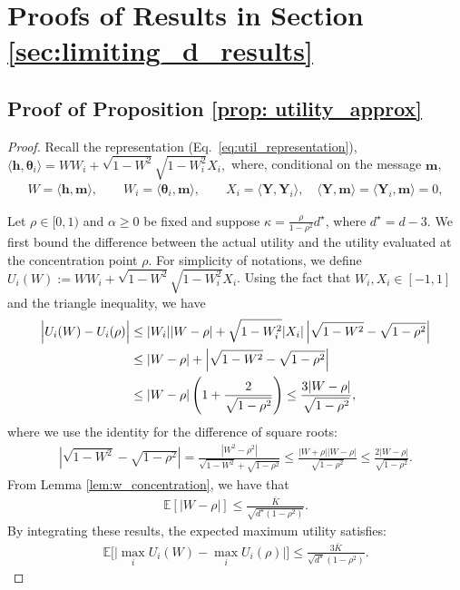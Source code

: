 \documentclass[12pt]{article}
\theoremstyle{definition}
\theoremstyle{remark}
\begin{document}
\section{Proofs of Results in Section \ref{sec:limiting_d_results}}

\subsection{Proof of Proposition \ref{prop: utility_approx}}
\label{sec:proof_prop_util_approx}

\begin{proof}
Recall the representation (Eq.~\eqref{eq:util_representation}), $\langle \mathbf{h},\boldsymbol{\theta}_i\rangle  =  W W_i  +  \sqrt{1-W^2} \sqrt{1-W_i^2} X_i,$ where, conditional on the message $\mathbf{m}$,
\begin{align*}
W=\langle \mathbf{h},\mathbf{m}\rangle,\qquad W_i=\langle \boldsymbol{\theta}_i,\mathbf{m}\rangle,\qquad X_i=\langle \mathbf{Y},\mathbf{Y}_i\rangle,\quad \langle \mathbf{Y},\mathbf{m}\rangle=\langle \mathbf{Y}_i,\mathbf{m}\rangle=0,
\end{align*}

Let $\rho\in[0,1)$ and $\alpha\geq 0$ be fixed and suppose $\kappa = \frac{\rho}{1-\rho^2}d^{\star}$, where $d^{\star}=d-3$. We first bound the difference between the actual utility and the utility evaluated at the concentration point $\rho$. For simplicity of notations, we define $U_i(W) := W W_i + \sqrt{1-W^2} \sqrt{1-W_i^2} X_i$. Using the fact that $W_i , X_i \in [-1,1]$ and the triangle inequality, we have
\begin{align*}
\Big| U_i(W) - U_i(\rho) \Big|
&\leq |W_i| |W-\rho| + \sqrt{1-W_i^2} |X_i| \left| \sqrt{1-W^2} - \sqrt{1-\rho^2} \right| \allowdisplaybreaks\\
&\leq |W-\rho| + \left| \sqrt{1-W^2} - \sqrt{1-\rho^2} \right| \allowdisplaybreaks\\
& \le |W-\rho| \left( 1 + \frac{2}{\sqrt{1-\rho^2}} \right) \le  \frac{3|W-\rho|}{\sqrt{1-\rho^2}},
\end{align*}
where we use the identity for the difference of square roots:
\begin{align}
\label{eq:sqrt_1_minus_w_sq}
\left| \sqrt{1-W^2} - \sqrt{1-\rho^2} \right| = \frac{|W^2 - \rho^2|}{\sqrt{1-W^2} + \sqrt{1-\rho^2}} \leq \frac{|W+\rho||W-\rho|}{\sqrt{1-\rho^2}} \leq \frac{2|W-\rho|}{\sqrt{1-\rho^2}}.
\end{align}
From Lemma \ref{lem:w_concentration}, we have that
\begin{align*}
   \mathbb{E}[|W-\rho|] \leq \frac{\bar K}{\sqrt{d^\star (1-\rho^2)}}.
\end{align*}
By integrating these results, the expected maximum utility satisfies:
\begin{align}
\label{eq:W_to_rho_max_util}
    \mathbb{E} \Big[ \big| \max_i U_i(W) - \max_i U_i(\rho) \big| \Big] \leq \frac{3 \bar K}{\sqrt{d^\star}(1-\rho^2)}.
\end{align}


\end{proof}
\end{document}
